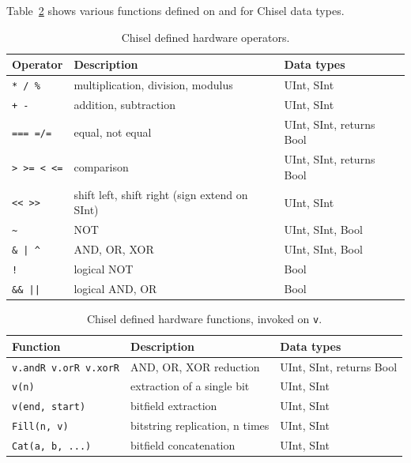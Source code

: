 \documentclass[%
    10pt,
    headinclude, footexclude,
    openright, %
    notitlepage,
    cleardoubleempty,
    headsepline,
    pointlessnumbers,
    bibtotoc, idxtotoc,
    ]{scrbook}
\newcommand{\code}[1]{{\small{\texttt{#1}}}}
\begin{document}
Table~\ref{tab:functions} shows various functions defined on and for Chisel data types.

\begin{table}
 \centering
  \begin{tabular}{lll}
    \toprule
    Operator & Description & Data types \\
    \midrule
    \code{* / \%} & multiplication, division, modulus & UInt, SInt \\
    \code{+ -} & addition, subtraction & UInt, SInt \\
    \code{=== =/=} & equal, not equal & UInt, SInt, returns Bool \\
    \code{> >= < <=} & comparison & UInt, SInt, returns Bool \\
    \code{<< >>} & shift left, shift right (sign extend on SInt) & UInt, SInt \\
    \code{\~} & NOT & UInt, SInt, Bool \\
    \code{\& | \^} & AND, OR, XOR & UInt, SInt, Bool \\
    \code{!} & logical NOT & Bool \\
    \code{\&\& ||} & logical AND, OR & Bool \\
    \bottomrule 
  \end{tabular} 
  \caption{Chisel defined hardware operators.}
 \label{tab:operators}
\end{table}


\begin{table}
 \centering
  \begin{tabular}{lll}
    \toprule
    Function & Description & Data types \\
    \midrule
    \code{v.andR v.orR v.xorR} & AND, OR, XOR reduction & UInt, SInt, returns Bool \\
    \code{v(n)} & extraction of a single bit & UInt, SInt \\
    \code{v(end, start)} & bitfield extraction & UInt, SInt \\
    \code{Fill(n, v)} & bitstring replication, n times & UInt, SInt \\
    \code{Cat(a, b, ...)} & bitfield concatenation & UInt, SInt \\
    \bottomrule 
  \end{tabular} 
  \caption{Chisel defined hardware functions, invoked on \code{v}.}
   \label{tab:functions}
\end{table}

\end{document}

